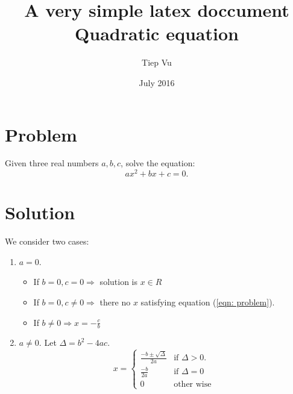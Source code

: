 \documentclass[10pt]{article}
\title{A very simple latex doccument \\
\textbf{Quadratic equation}}
\author{Tiep Vu}
\date{July 2016}
\begin{document}
\maketitle

\section{Problem} %
\label{sec:problem}
	Given three real numbers $a, b, c$, solve the equation: 
	\begin{equation}
	\label{eqn: problem}
	    ax^2 + bx + c = 0.
	\end{equation}

\section{Solution} %
\label{sec:solution}
We consider two cases: 
\begin{enumerate}
	\item $a = 0$.
	\begin{itemize}
		\item If $ b = 0, c = 0 \Rightarrow$ solution is $x \in R$ 

		\item If $ b = 0, c \neq 0 \Rightarrow$ there no $x$ satisfying equation 
		(\ref{eqn: problem}). 

		\item If $\displaystyle b \neq 0 \Rightarrow x = -\frac{c}{b}$
	\end{itemize}
	\item $a \neq 0$. Let $\Delta = b^2 - 4ac.$
	\begin{equation}
	\label{eqn:solution}
		\displaystyle
	    x = \left\{
	    	\begin{array} {cl}
	    		
	    		\displaystyle \frac{-b \pm \sqrt{\Delta}}{2a} & \text{if~} \Delta > 0. \\
	    		\displaystyle \frac{-b}{2a}                   & \text{if~} \Delta = 0 \\
	    		\displaystyle 0                               & \text{other wise}
	    	\end{array}
		    \right. 	
	\end{equation}
\end{enumerate}
\end{document}
